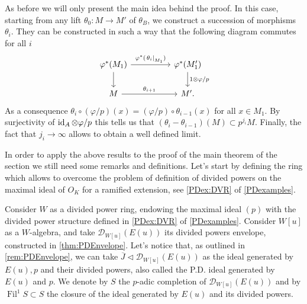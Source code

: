 \begin{rem}[]
	As before we will only present the main idea behind the proof.
	In this case, starting from any lift $\theta_0\colon M \to M'$
	of $\theta_B$, we construct a succession of morphisms \(\theta_i\).
	They can be constructed in such a way that the following diagram commutes for all \(i\)
	\begin{equation*}
	\begin{tikzcd}[column sep=4.8em]
		\varphi^*(M_1) \arrow[r, "\varphi^*(\left.\theta_i\right|_{ M_1 })", rightarrow] 
		\arrow[d, "", rightarrow] &
		\varphi^*(M_1') \arrow[d, "1 \otimes \varphi/p", rightarrow] \\
		M \arrow[r, "\theta_{ i+1 }", rightarrow] &
		M'.
	\end{tikzcd}
	\end{equation*}
	As a consequence \(\theta_i \circ (\varphi/p) (x) = (\varphi/p) \circ \theta_{ i-1 } (x)\)
	for all \(x \in M_1\).
	By surjectivity of \(\operatorname{id}_{ A } \otimes \varphi/p\) this
	tells us that \(\left( \theta_i - \theta_{ i-1 } \right)(M) \subset p^{ j_i }M\).
	Finally, the fact that $j_i \to \infty$ allows to obtain a well defined limit.
\end{rem}


\noindent
In order to apply the above results to the proof of the main theorem of the section
we still need some remarks and definitions.
Let's start by defining the ring which allows to overcome the problem of
definition of divided powers on the maximal ideal of $O_K$
for a ramified extension, see \cref{PDex:DVR} of \cref{PDexamples}.


\begin{defn}[]
	Consider $W$ as a divided power ring, endowing the maximal ideal $(p)$
	with the divided power structure defined in \cref{PDex:DVR} of \cref{PDexamples}.
	Consider $W[u]$ as a $W$-algebra, and take $\mathcal{D}_{W[u]}(E(u))$
	its divided powers envelope, constructed in \cref{thm:PDEnvelope}.
	Let's notice that, as outlined in \cref{rem:PDEnvelope},
	we can take $\overline{J} \triangleleft \mathcal{D}_{W[u]}(E(u))$ 
	as the ideal generated by $E(u), p$ and their divided powers,
	also called the P.D. ideal generated by $E(u)$ and $p$.
	We denote by $S$ the $p$-adic completion of $\mathcal{D}_{W[u]}(E(u))$
	and by $\operatorname{Fil}^1 S \subset S$ the closure of the ideal
	generated by $E(u)$ and its divided powers.
\end{defn}


